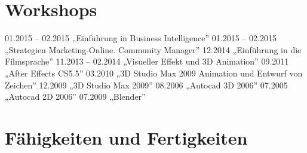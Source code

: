 \documentclass[11pt,a4paper,roman]{moderncv}
\begin{document}
\section{Workshops} 
 			{01.2015 -- 02.2015 „Einführung in Business Intelligence”}
\cvline{} 					{01.2015 -- 02.2015 „Strategien Marketing-Online. Community Manager”}
\cvline{} 					{12.2014 \hspace{15mm} „Einführung in die Filmsprache”}
	{11.2013 -- 02.2014 „Visueller Effekt und 3D Animation”}
		{09.2011 \hspace{15mm} „After Effects CS5.5”}
\cvline{}					{03.2010 \hspace{15mm} „3D Studio Max 2009 Animation und Entwurf von Zeichen”}
\cvline{}					{12.2009 \hspace{15mm} „3D Studio Max 2009”}
\cvline{}					{08.2006 \hspace{15mm} „Autocad 3D 2006”}
\cvline{}					{07.2005 \hspace{15mm} „Autocad 2D 2006”}
				{07.2009 \hspace{15mm} „Blender”}

\section{Fähigkeiten und Fertigkeiten} 




% 

\newpage
\end{document}
